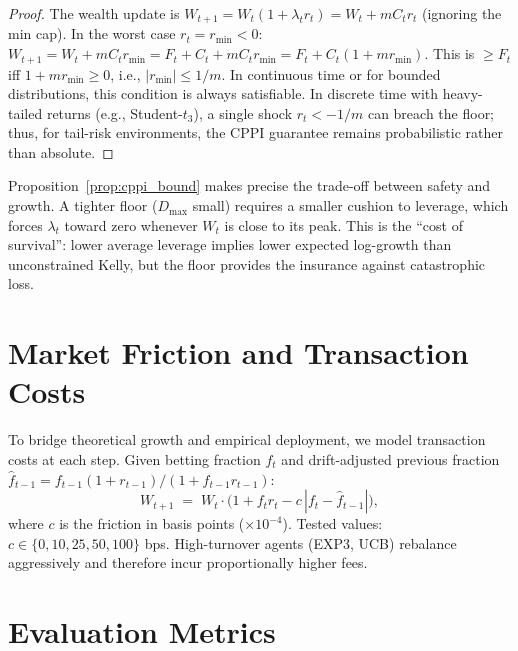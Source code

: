 \begin{proof}
The wealth update is
$W_{t+1} = W_t(1 + \lambda_t r_t) = W_t + m C_t r_t$ (ignoring the min cap).
In the worst case $r_t = r_{\min} < 0$:
$W_{t+1} = W_t + m C_t r_{\min} = F_t + C_t + m C_t r_{\min}
= F_t + C_t(1 + m r_{\min})$.
This is $\geq F_t$ iff $1 + m r_{\min} \geq 0$, i.e., $|r_{\min}| \leq 1/m$.
In continuous time or for bounded distributions, this condition is always
satisfiable. In discrete time with heavy-tailed returns (e.g., Student-$t_3$),
a single shock $r_t < -1/m$ can breach the floor; thus, for tail-risk
environments, the CPPI guarantee remains probabilistic rather than absolute.
\end{proof}

\begin{remark}
Proposition~\ref{prop:cppi_bound} \citep{black1992theory, busseti2016risk} makes precise the trade-off between safety
and growth.  A tighter floor ($D_{\max}$ small) requires a smaller cushion to
leverage, which forces $\lambda_t$ toward zero whenever $W_t$ is close to its
peak.  This is the ``cost of survival'': lower average leverage implies lower
expected log-growth than unconstrained Kelly, but the floor provides the
insurance against catastrophic loss.
\end{remark}

\section{Market Friction and Transaction Costs}

To bridge theoretical growth and empirical deployment, we model transaction
costs at each step.  Given betting fraction $f_t$ and drift-adjusted previous
fraction $\hat f_{t-1} = f_{t-1}(1+r_{t-1})/(1+f_{t-1}r_{t-1})$:
\begin{equation}
    W_{t+1} \;=\; W_t\cdot\bigl(1 + f_t r_t - c\,|f_t - \hat f_{t-1}|\bigr),
    \label{eq:friction}
\end{equation}
where $c$ is the friction in basis points ($\times 10^{-4}$).  Tested values:
$c\in\{0,10,25,50,100\}$ bps.  High-turnover agents (EXP3, UCB) rebalance
aggressively and therefore incur proportionally higher fees.

\section{Evaluation Metrics}

